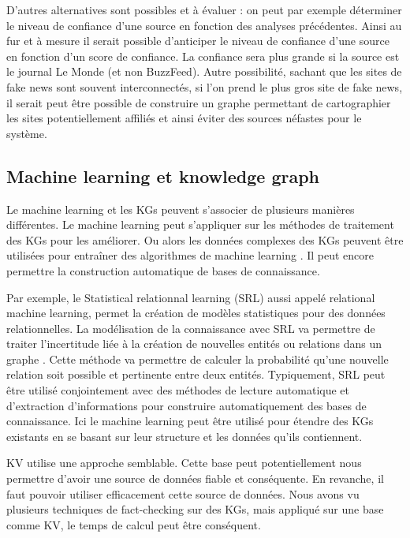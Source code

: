 D'autres alternatives sont possibles et à évaluer : on peut par exemple déterminer le niveau de confiance d'une source en fonction des analyses précédentes. Ainsi au fur et à mesure il serait possible d'anticiper le niveau de confiance d'une source en fonction d'un score de confiance. La confiance sera plus grande si la source est le journal Le Monde (et non BuzzFeed). Autre possibilité, sachant que les sites de fake news sont souvent interconnectés, si l'on prend le plus gros site de fake news, il serait peut être possible de construire un graphe permettant de cartographier les sites potentiellement affiliés et ainsi éviter des sources néfastes pour le système.

\subsection{Machine learning et knowledge graph}

Le machine learning et les KGs peuvent s'associer de plusieurs manières différentes. Le machine learning peut s'appliquer sur les méthodes de traitement des KGs pour les améliorer. Ou alors les données complexes des KGs peuvent être utilisées pour entraîner des algorithmes de machine learning \cite{wilcke2017knowledge}. Il peut encore permettre la construction automatique de bases de connaissance.

Par exemple, le Statistical relationnal learning (SRL) aussi appelé relational machine learning, permet la création de modèles statistiques pour des données relationnelles. La modélisation de la connaissance avec SRL va permettre de traiter l'incertitude liée à la création de nouvelles entités ou relations dans un graphe \cite{nickel2016review}. Cette méthode va permettre de calculer la probabilité qu'une nouvelle relation soit possible et pertinente entre deux entités. Typiquement, SRL peut être utilisé conjointement avec des méthodes de lecture automatique et d'extraction d'informations pour construire automatiquement des bases de connaissance. Ici le machine learning peut être utilisé pour étendre des KGs existants en se basant sur leur structure et les données qu'ils contiennent.

KV utilise une approche semblable. Cette base peut potentiellement nous permettre d'avoir une source de données fiable et conséquente. En revanche, il faut pouvoir utiliser efficacement cette source de données. Nous avons vu plusieurs techniques de fact-checking sur des KGs, mais appliqué sur une base comme KV, le temps de calcul peut être conséquent.

